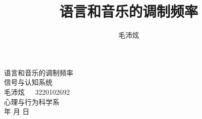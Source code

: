 \documentclass[jou,12pt,floatsintext]{apa7} %
\title{\heiti 语言和音乐的调制频率} %
\author{\fangsong 毛沛炫}
\affiliation{(浙江大学心理与行为科学系\ \ 310058)}
\begin{document}
\begin{titlepage}
    \centering
    \vspace*{4cm} %
    \Huge
    {\heiti 语言和音乐的调制频率} \\
    \vspace{0.75cm}
    \large
    信号与认知系统 \\
    \vspace{2.25cm}
    \large
    毛沛炫\ \ \ 3220102692 \\
    \vspace{0.5cm}
    \large
    心理与行为科学系 \\
    \vspace{0.5cm}
    \large
    \number\year 年 \number\month 月 \number\day 日 \\
    \vfill
\end{titlepage}

\maketitle %



\end{document}
